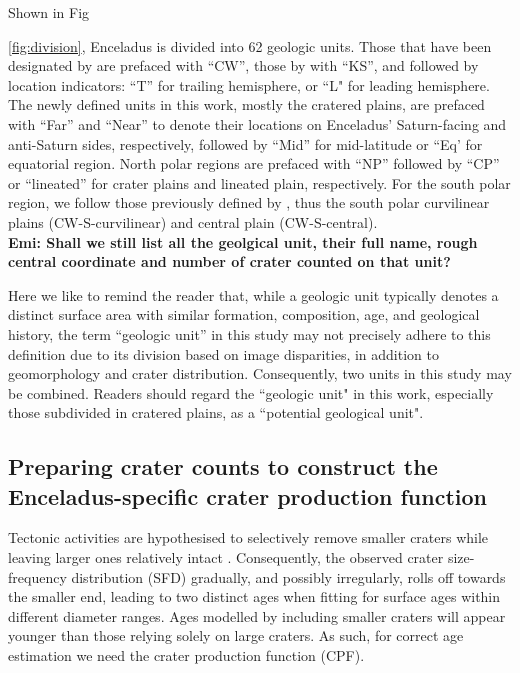 \documentclass[preprint,11pt,3p,times,authoryear]{elsarticle}
\begin{document}
Shown in Fig~{\ref{fig:division}, Enceladus is divided into 62 geologic units. Those that have been designated by \citet{CrowWillard2015} are prefaced with ``CW'', those by \citet{Kirchoff2009} with ``KS'', and followed by location indicators: ``T'' for trailing hemisphere, or ``L" for leading hemisphere. The newly defined units in this work, mostly the cratered plains, are prefaced with ``Far'' and ``Near'' to denote their locations on Enceladus' Saturn-facing and anti-Saturn sides, respectively, followed by ``Mid'' for mid-latitude or ``Eq’ for equatorial region. North polar regions are prefaced with ``NP'' followed by ``CP'' or ``lineated'' for crater plains and lineated plain, respectively. For the south polar region, we follow those previously defined by \citet{CrowWillard2015}, thus the south polar curvilinear plains (CW-S-curvilinear) and central plain (CW-S-central). \\
\textbf{Emi: Shall we still list all the geolgical unit, their full name, rough central coordinate and number of crater counted on that unit?}

Here we like to remind the reader that, while a geologic unit typically denotes a distinct surface area with similar formation, composition, age, and geological history, the term ``geologic unit'' in this study may not precisely adhere to this definition due to its division based on image disparities, in addition to geomorphology and crater distribution. Consequently, two units in this study may be combined. Readers should regard the ``geologic unit" in this work, especially those subdivided in cratered plains, as a ``potential geological unit".

\subsection{Preparing crater counts to construct the Enceladus-specific crater production function}
\label{subsec:cpf}
Tectonic activities are hypothesised to selectively remove smaller craters while leaving larger ones relatively intact \citep{Michael2010}. Consequently, the observed crater size-frequency distribution (SFD) gradually, and possibly irregularly, rolls off towards the smaller end, leading to two distinct ages when fitting for surface ages within different diameter ranges. Ages modelled by including smaller craters will appear younger than those relying solely on large craters. As such, for correct age estimation we need the crater production function (CPF).\\

}
\end{document}
